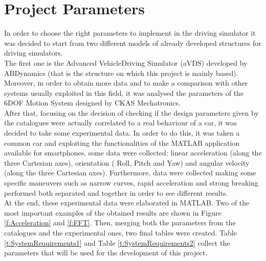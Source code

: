 \documentclass[10.5pt, twocolumn]{article}
\begin{document}
\section{Project Parameters}
In order to choose the right parameters to implement in the driving simulator it was decided to start from two different models of already developed structures for driving simulators.\\
The first one is the Advanced VehicleDriving Simulator (aVDS) developed by ABDynamics (that is the structure on which this project is mainly based). Moreover, in order to obtain more data and to make a comparison with other systems usually exploited in this field, it was analysed the parameters of the 6DOF Motion System designed by CKAS Mechatronics.\\
After that, focusing on the decision of checking if the design parameters given by the catalogues were actually correlated to a real behaviour of a car, it was decided to take some experimental data. In order to do this, it was taken a common car and exploiting the functionalities of the MATLAB application available for smartphones, some data were collected: linear acceleration (along the three Cartesian axes), orientation ( Roll, Pitch and Yaw) and angular velocity (along the three Cartesian axes). Furthermore, data were collected making some specific maneuvers such as narrow curves, rapid acceleration and strong breaking performed both separated and together in order to see different results. \\
At the end, these experimental data were elaborated in MATLAB. Two of the most important examples of the obtained results are shown in Figure \ref{f:Acceleration} and \ref{f:FFT}. Then, merging both the parameters from the catalogues and the experimental ones, two final tables were created. Table \ref{t:SystemRequirements1} and Table \ref{t:SystemRequirements2} collect the parameters that will be used for the development of this project. 
\end{document}
